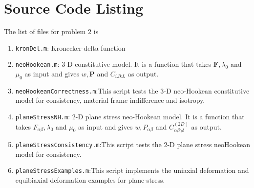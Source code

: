 \documentclass[../main.tex]{subfiles}
\begin{document}
\section{Source Code Listing}
The list of files for problem 2 is
\begin{enumerate}
\item \texttt{kronDel.m}: Kronecker-delta function
\item \texttt{neoHookean.m}: 3-D constitutive model. It is a function that takes $\mathbf{F},\lambda_0$ and $\mu_0$ as input and gives $w,\mathbf{P}$ and $C_{iJkL}$ as output.
\item \texttt{neoHookeanCorrectness.m}:This script tests the 3-D neo-Hookean constitutive model for consistency, material frame indifference and isotropy.
\item \texttt{planeStressNH.m}: 2-D plane stress neo-Hookean model. It is a function that takes $F_{\alpha\beta},\lambda_0$ and $\mu_0$ as input and gives $w,P_{\alpha\beta}$ and $C^{(2D)}_{\alpha\beta\gamma\delta}$ as output.
\item \texttt{planeStressConsistency.m}:This script tests the 2-D plane stress neoHookean model for consistency.
\item \texttt{planeStressExamples.m}:This script implements the uniaxial deformation and equibiaxial deformation examples for plane-stress.
\end{enumerate}
\end{document}
